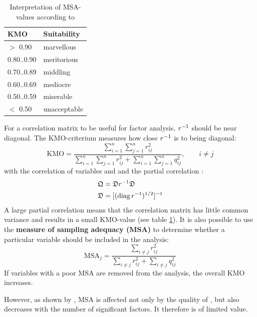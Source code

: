 \begin{refsection}
\begin{table}
  \caption{Interpretation of MSA-values according to \parencite{Kai-74}}
  \label{tab:KMO}
  \centering
    \begin{tabular}{ll}
      \toprule
      KMO        & Suitability \\
      \midrule
 \(> \) 0.90   & marvellous  \\
      0.80..0.90 & meritorious \\
      0.70..0.89 & middling    \\
      0.60..0.69 & mediocre    \\
      0.50..0.59 & miserable   \\
 \(< \) 0.50   & unacceptable\\
      \bottomrule
    \end{tabular}
\end{table}

For a correlation matrix  to be useful for factor analysis, \(r^{-1} \) should be near diagonal.
The KMO-criterium measures how close \(r^{-1} \) is to being diagonal:
\begin{equation}
  \mathrm{KMO} = \frac{\sum_{i=1}^{n}{\sum_{j=1}^{n}{r^2_{ij}}}}{\sum_{i=1}^{n}{\sum_{j=1}^{n}{r^2_{ij}}} +
  \sum_{i=1}^{n}{\sum_{j=1}^{n}{q^2_{ij}}}}, \qquad i \neq j
\end{equation}
with  the correlation of variables  and  and  the partial
correlation \parencite{Cer-77}:
\begin{align}
  \mathfrak{Q} &= \mathfrak{D} r^{-1} \mathfrak{D} \\
  \mathfrak{D} &= [(\operatorname{diag}{r^{-1}})^{1/2}]^{-1}
\end{align}
A large partial correlation means that the correlation matrix has little common variance and results in a small
KMO-value (see table \ref{tab:KMO}). It is also possible to use the \textbf{measure of sampling adequacy (MSA)} to
determine whether a particular variable  should be included in the analysis:
\begin{equation}
  \mathrm{MSA}_j = \frac{\sum_{i \neq j}{r^2_{ij}}}{\sum_{i \neq j}{r^2_{ij}} + \sum_{i \neq j}{q^2_{ij}}}
\end{equation}
If variables with a poor MSA are removed from the analysis, the overall KMO increases.

However, as shown by \parencite[p. 147]{Ren-02}, MSA is affected not only by the quality of , but also
decreases with the number of significant factors. It therefore is of limited value.


\end{refsection}
